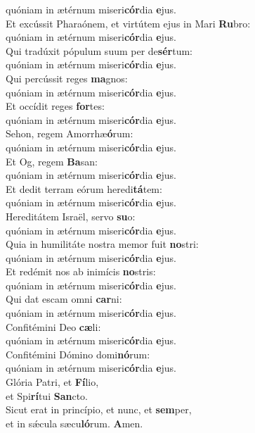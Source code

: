 \evenverse quóniam in ætérnum miseri\textbf{cór}dia \textbf{e}jus.\\
\oddverse Et excússit Pharaónem, et virtútem ejus in Mari \textbf{Ru}bro:~\*\\
\oddverse quóniam in ætérnum miseri\textbf{cór}dia \textbf{e}jus.\\
\evenverse Qui tradúxit pópulum suum per de\textbf{sér}tum:~\*\\
\evenverse quóniam in ætérnum miseri\textbf{cór}dia \textbf{e}jus.\\
\oddverse Qui percússit reges \textbf{ma}gnos:~\*\\
\oddverse quóniam in ætérnum miseri\textbf{cór}dia \textbf{e}jus.\\
\evenverse Et occídit reges \textbf{for}tes:~\*\\
\evenverse quóniam in ætérnum miseri\textbf{cór}dia \textbf{e}jus.\\
\oddverse Sehon, regem Amorrhæ\textbf{ó}rum:~\*\\
\oddverse quóniam in ætérnum miseri\textbf{cór}dia \textbf{e}jus.\\
\evenverse Et Og, regem \textbf{Ba}san:~\*\\
\evenverse quóniam in ætérnum miseri\textbf{cór}dia \textbf{e}jus.\\
\oddverse Et dedit terram eórum heredi\textbf{tá}tem:~\*\\
\oddverse quóniam in ætérnum miseri\textbf{cór}dia \textbf{e}jus.\\
\evenverse Hereditátem Israël, servo \textbf{su}o:~\*\\
\evenverse quóniam in ætérnum miseri\textbf{cór}dia \textbf{e}jus.\\
\oddverse Quia in humilitáte nostra memor fuit \textbf{no}stri:~\*\\
\oddverse quóniam in ætérnum miseri\textbf{cór}dia \textbf{e}jus.\\
\evenverse Et redémit nos ab inimícis \textbf{no}stris:~\*\\
\evenverse quóniam in ætérnum miseri\textbf{cór}dia \textbf{e}jus.\\
\oddverse Qui dat escam omni \textbf{car}ni:~\*\\
\oddverse quóniam in ætérnum miseri\textbf{cór}dia \textbf{e}jus.\\
\evenverse Confitémini Deo \textbf{cæ}li:~\*\\
\evenverse quóniam in ætérnum miseri\textbf{cór}dia \textbf{e}jus.\\
\oddverse Confitémini Dómino domi\textbf{nó}rum:~\*\\
\oddverse quóniam in ætérnum miseri\textbf{cór}dia \textbf{e}jus.\\
\evenverse Glória Patri, et \textbf{Fí}lio,~\*\\
\evenverse et Spi\textbf{rí}tui \textbf{San}cto.\\
\oddverse Sicut erat in princípio, et nunc, et \textbf{sem}per,~\*\\
\oddverse et in sǽcula sæcu\textbf{ló}rum. \textbf{A}men.\\
